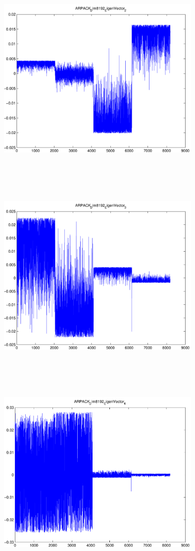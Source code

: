 \documentclass[9pt]{article}
\theoremstyle{plain}
\theoremstyle{definition}
\theoremstyle{remark}
\numberwithin{equation}{section}
\begin{document}
\includegraphics[width=10.0cm,height=10.0cm]{ARPACK_Dim8192_EigenVector_2.pdf}

\includegraphics[width=10.0cm,height=10.0cm]{ARPACK_Dim8192_EigenVector_3.pdf}

\includegraphics[width=10.0cm,height=10.0cm]{ARPACK_Dim8192_EigenVector_4.pdf}
\end{document}

